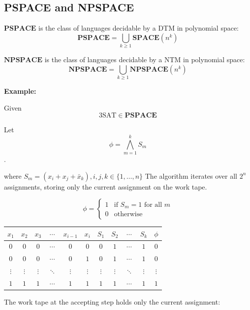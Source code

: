 \documentclass[12pt,a4paper,openany]{article}
\begin{document}
\subsection{PSPACE and NPSPACE}

\noindent $\mathbf{PSPACE}$ is the class of languages decidable by a DTM in polynomial space:
\begin{equation*}
\mathbf{PSPACE} = \bigcup_{k \geq 1} \mathbf{SPACE}(n^k)
\end{equation*}


\noindent $\mathbf{NPSPACE}$ is the class of languages decidable by a NTM in polynomial space:
\begin{equation*}
\mathbf{NPSPACE}= \bigcup_{k \geq 1} \mathbf{NPSPACE}(n^k)
\end{equation*}

\textbf{Example:}

Given \[\mathrm{3SAT} \in \mathbf{PSPACE}\]

Let \[\phi = \bigwedge_{m=1}^{k} S_m \].

where  $S_m = (x_i + x_j + \bar{x}_k), i,j,k \in \{1,\ldots,n\}$
The algorithm iterates over all $2^n$ assignments, storing only the current assignment on the work tape.

\[
\phi = \begin{cases} 1 & \text{if } S_m = 1 \text{ for all } m \\ 0 & \text{otherwise} \end{cases}
\]

\begin{center}
\begin{tabular}{cccccc|cccc|c}
$x_1$ & $x_2$ & $x_3$ & $\cdots$ & $x_{i-1}$ & $x_i$ & $S_1$ & $S_2$ & $\cdots$ & $S_k$ & $\phi$ \\ \hline
$0$ & $0$ & $0$ & $\cdots$ & $0$ & $0$ & $0$ & $1$ & $\cdots$ & $1$ & $0$ \\
$0$ & $0$ & $0$ & $\cdots$ & $0$ & $1$ & $0$ & $1$ & $\cdots$ & $1$ & $0$ \\
$\vdots$ & $\vdots$ & $\vdots$ & $\ddots$ & $\vdots$ & $\vdots$ & $\vdots$ & $\vdots$ & $\ddots$ & $\vdots$ & $\vdots$ \\
$1$ & $1$ & $1$ & $\cdots$ & $1$ & $1$ & $1$ & $1$ & $\cdots$ & $1$ & $1$ \\
\end{tabular}
\end{center}

\noindent The work tape at the accepting step holds only the current assignment:
\end{document}
